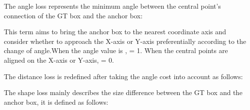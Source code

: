\documentclass[lettersize,journal]{IEEEtran}
\begin{document}
	\par The angle loss represents the minimum angle between the central point's connection of the GT box and the anchor box:
	
	\par This term aims to bring the anchor box to the nearest coordinate axis and consider whether to approach the X-axis or Y-axis preferentially according to the change of angle.When the angle value is ,  = 1. When the central points are aligned on the X-axis or Y-axis,  = 0. 
	\par The distance loss is redefined after taking the angle cost into account as follows: 
	
	
	\par The shape loss mainly describes the size difference between the GT box and the anchor box, it is defined as follows:
	
\end{document}
